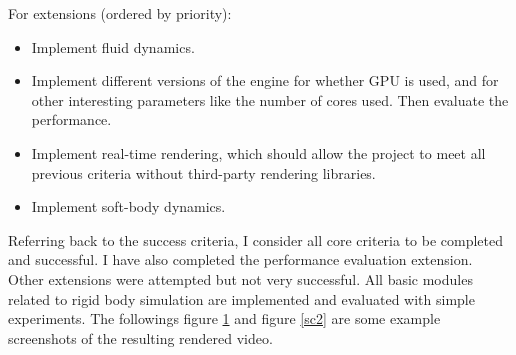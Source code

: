\documentclass[12pt,a4paper,twoside,openright]{report}
\begin{document}
For extensions (ordered by priority):

\begin{itemize}
\item Implement fluid dynamics.

\item Implement different versions of the engine for whether GPU is used, and for other interesting parameters like the number of cores used. 
Then evaluate the performance.

\item Implement real-time rendering, which should allow the project to meet all previous criteria without third-party rendering libraries. 

\item Implement soft-body dynamics.
\end{itemize}

Referring back to the success criteria, I consider all core criteria to be completed and successful. I have also completed the performance evaluation extension. Other extensions were attempted but not very successful. All basic modules related to rigid body simulation are implemented and evaluated with simple experiments. The followings figure \ref{sc1} and figure \ref{sc2} are some example screenshots of the resulting rendered video.

\begin{figure}
    \captionsetup{labelsep=none}
  \caption{}
  \label{sc1}
\end{figure}
\end{document}
